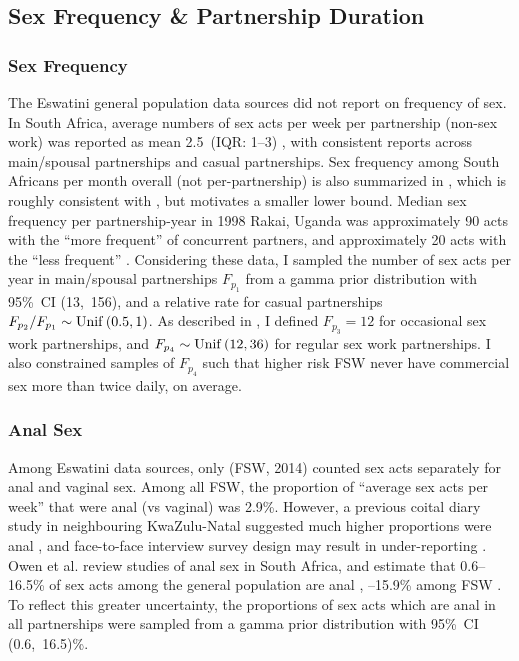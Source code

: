 \subsection{Sex Frequency \& Partnership Duration}\label{model.par.sex}
\subsubsection{Sex Frequency}\label{model.par.sex.freq}
The Eswatini general population data sources \cite{SDHS2006,SHIMS1,SHIMS2}
did not report on frequency of sex. %
In South Africa, average numbers of sex acts per week per partnership (non-sex work)
was reported as mean 2.5~(IQR: 1--3) \cite{Delva2013},
with consistent reports across main/spousal partnerships and casual partnerships.
Sex frequency among South Africans per month overall (not per-partnership)
is also summarized in \cite[Figure~3.15]{Shisana2005},
which is roughly consistent with \cite{Delva2013}, but motivates a smaller lower bound.
Median sex frequency per partnership-year in 1998 Rakai, Uganda was
approximately 90 acts with the ``more frequent'' of concurrent partners, and
approximately 20 acts with the ``less frequent'' \cite{Morris2010}.
Considering these data,
I sampled the number of sex acts per year in main/spousal partnerships
$F_{p_{1}}$ from a gamma prior distribution with 95\%~CI (13,~156),
and a relative rate for casual partnerships $F_{p_{2}}/F_{p_{1}} \sim \operatorname{Unif}\,(0.5,1)$.
As described in ,
I defined $F_{p_{3}} = 12$ for occasional sex work partnerships,
and $F_{p_{4}} \sim \operatorname{Unif}\,(12,36)$ for regular sex work partnerships.
I also constrained samples of $F_{p_{4}}$ such that
higher risk FSW never have commercial sex more than twice daily, on average.
\subsubsection{Anal Sex}\label{model.par.sex.anal}
Among Eswatini data sources, only \cite{EswKP2014} (FSW, 2014)
counted sex acts separately for anal and vaginal sex.
Among all FSW, the proportion of ``average sex acts per week'' that were anal (vs vaginal) was 2.9\%.
However, a previous coital diary study in neighbouring KwaZulu-Natal suggested
much higher proportions were anal \cite{Ramjee1999},
and face-to-face interview survey design may result in under-reporting \cite{Owen2020}.
Owen et al. review studies of anal sex in South Africa, and estimate that
0.6--16.5\% of sex acts among the general population are anal \cite{Owen2017}, --15.9\% among FSW \cite{Owen2020}.
To reflect this greater uncertainty, the proportions of sex acts which are anal
in all partnerships were sampled from a gamma prior distribution with 95\%~CI (0.6,~16.5)\%.
